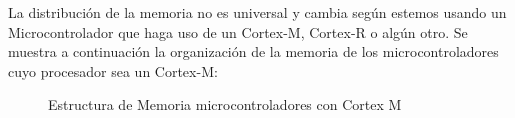 \documentclass[a4paper,12pt]{report} %
\begin{document}
La distribución de la memoria no es universal y cambia según estemos usando un Microcontrolador que haga uso de un Cortex-M, Cortex-R o algún otro. Se muestra a continuación la organización de la memoria de los microcontroladores cuyo procesador sea un Cortex-M:



\begin{figure}[H]
	\centering
	\caption{Estructura de Memoria microcontroladores con Cortex M}
	\label{memoria}
\end{figure}
\end{document}
